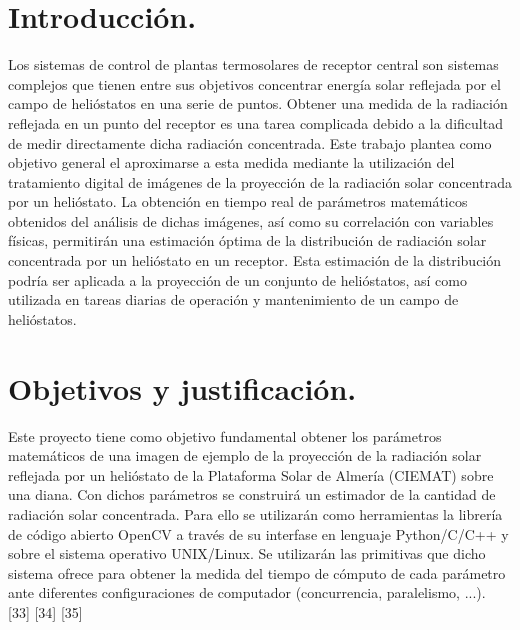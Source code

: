 \documentclass[12pt]{article}
\begin{document}

\tableofcontents
\pagebreak


\section{Introducción.}

Los sistemas de control de plantas termosolares de receptor central son sistemas complejos que tienen entre sus objetivos concentrar energía solar reflejada por el campo de helióstatos en una serie de puntos. Obtener una medida de la radiación reflejada en un punto del receptor es una tarea complicada debido a la dificultad de medir directamente dicha radiación concentrada. Este trabajo plantea como objetivo general el aproximarse a esta medida mediante la utilización del tratamiento digital de imágenes de la proyección de la radiación solar concentrada por un helióstato.
La obtención en tiempo real de parámetros matemáticos obtenidos del análisis de dichas imágenes, así como su correlación con variables físicas, permitirán una estimación óptima de la distribución de radiación solar concentrada por un helióstato en un receptor. Esta estimación de la distribución podría ser aplicada a la proyección de un conjunto de helióstatos, así como utilizada en tareas diarias de operación y mantenimiento de un campo de helióstatos.

\section{Objetivos y justificación.}

Este proyecto tiene como objetivo fundamental obtener los parámetros matemáticos de una imagen de ejemplo de la proyección de la radiación solar reflejada por un helióstato de la Plataforma Solar de Almería (CIEMAT) sobre una diana. Con dichos parámetros se construirá un estimador de la cantidad de radiación solar concentrada.
Para ello se utilizarán como herramientas la librería de código abierto OpenCV a través de su interfase en lenguaje Python/C/C++ y sobre el sistema operativo UNIX/Linux. Se utilizarán las primitivas que dicho sistema ofrece para obtener la medida del tiempo de cómputo de cada parámetro ante diferentes configuraciones de computador (concurrencia, paralelismo, ...). [33] [34] [35]
\end{document}
